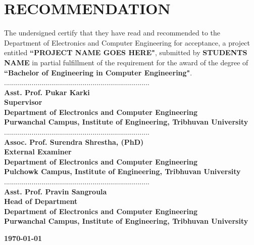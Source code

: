 \newpage
{}
\section*{RECOMMENDATION}
The undersigned certify that they have read and recommended to the Department of
Electronics and Computer Engineering for acceptance, a project entitled \textbf{``PROJECT NAME GOES HERE"}, submitted by \textbf{STUDENTS NAME} in partial fulfillment of the requirement for the award of the degree of \textbf{``Bachelor of Engineering in Computer Engineering"}.
        \vspace{1cm} \\
..........................................................................\\
\textbf{Asst. Prof. Pukar Karki\\
Supervisor\\
Department of Electronics and Computer Engineering\\
Purwanchal Campus, Institute of Engineering, Tribhuvan University}
        \vspace{1cm} \\
..........................................................................\\
\textbf{Assoc. Prof. Surendra Shrestha, (PhD)\\
External Examiner \\
Department of Electronics and Computer Engineering\\
Pulchowk Campus, Institute of Engineering, Tribhuvan University}
        \vspace{1cm} \\
..........................................................................\\
\textbf{
Asst. Prof. Pravin Sangroula\\ 
Head of Department \\
Department of Electronics and Computer Engineering\\Purwanchal Campus, Institute of Engineering, Tribhuvan University}\par
\vspace{2.5cm}

\begin{center}
\textbf{\today}
\end{center}